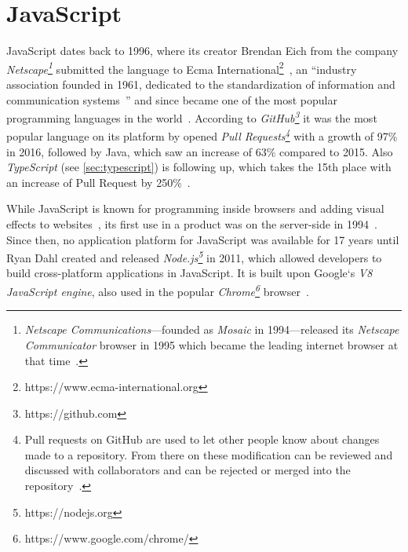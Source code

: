 %


\section{JavaScript}
\label{sec:javascript}

JavaScript dates back to 1996, where its creator Brendan Eich from the company \emph{Netscape\footnote{\emph{Netscape Communications}---founded as \emph{Mosaic} in 1994---released its \emph{Netscape Communicator} browser in 1995 which became the leading internet browser at that time~\cite{HistoryOfNetscape:Cooper:2014}.}} submitted the language to Ecma International\footnote{https://www.ecma-international.org}~\cite[p.~28]{ProJavaScriptDevelopment:Odell:2014}, an ``industry association founded in 1961, dedicated to the standardization of information and communication systems~\cite{EcmaInternational:Ecma}'' and since became one of the most popular programming languages in the world~\cite[p.~2]{JavaScriptTheGoodParts:Crockford:2008}. According to \emph{GitHub\footnote{https://github.com}} it was the most popular language on its platform by opened \emph{Pull Requests\footnote{Pull requests on GitHub are used to let other people know about changes made to a repository. From there on these modification can be reviewed and discussed with collaborators and can be rejected or merged into the repository~\cite{GitHubPullRequest:GitHub:2014}.}} with a growth of 97\% in 2016, followed by Java, which saw an increase of 63\% compared to 2015. Also \emph{TypeScript} (see \ref{sec:typescript}) is following up, which takes the 15th place with an increase of Pull Request by 250\%~\cite{GitHubOctoverse2016:GitHub:2016}.

While JavaScript is known for programming inside browsers and adding visual effects to websites~\cite[p.~4]{JavaScriptObjectProgramming:Rinehart:2015}, its first use in a product was on the server-side in 1994~\cite[p.~369]{ProJavaScriptDevelopment:Odell:2014}. Since then, no application platform for JavaScript was available for 17 years until Ryan Dahl created and released \emph{Node.js\footnote{https://nodejs.org}} in 2011, which allowed developers to build cross-platform applications in JavaScript. It is built upon Google`s \emph{V8 JavaScript engine}, also used in the popular \emph{Chrome\footnote{https://www.google.com/chrome/}} browser~\cite[p.~369]{ProJavaScriptDevelopment:Odell:2014}.

